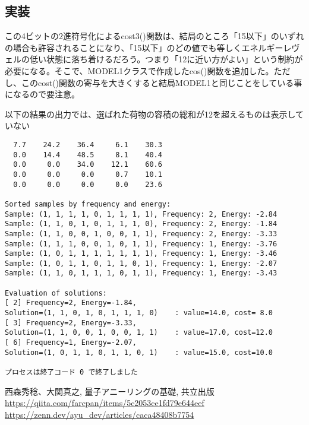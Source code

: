 \documentclass[uplatex,dvipdfmx,a4paper,11pt,oneside,openany]{jsbook}
\begin{document}
\subsection{実装}



この4ビットの2進符号化によるcost3()関数は、結局のところ「15以下」のいずれの場合も許容されることになり、「15以下」のどの値でも等しくエネルギーレヴェルの低い状態に落ち着けるだろう。つまり「12に近い方がよい」という制約が必要になる。そこで、MODEL1クラスで作成したcos()関数を追加した。ただし、このcost()関数の寄与を大きくすると結局MODEL1と同じことをしている事になるので要注意。

以下の結果の出力では、選ばれた荷物の容積の総和が12を超えるものは表示していない

\begin{verbatim}
  7.7    24.2    36.4     6.1    30.3
  0.0    14.4    48.5     8.1    40.4
  0.0     0.0    34.0    12.1    60.6
  0.0     0.0     0.0     0.7    10.1
  0.0     0.0     0.0     0.0    23.6

Sorted samples by frequency and energy:
Sample: (1, 1, 1, 1, 0, 1, 1, 1, 1), Frequency: 2, Energy: -2.84
Sample: (1, 1, 0, 1, 0, 1, 1, 1, 0), Frequency: 2, Energy: -1.84
Sample: (1, 1, 0, 0, 1, 0, 0, 1, 1), Frequency: 2, Energy: -3.33
Sample: (1, 1, 1, 0, 0, 1, 0, 1, 1), Frequency: 1, Energy: -3.76
Sample: (1, 0, 1, 1, 1, 1, 1, 1, 1), Frequency: 1, Energy: -3.46
Sample: (1, 0, 1, 1, 0, 1, 1, 0, 1), Frequency: 1, Energy: -2.07
Sample: (1, 1, 0, 1, 1, 1, 0, 1, 1), Frequency: 1, Energy: -3.43

Evaluation of solutions:
[ 2] Frequency=2, Energy=-1.84,
Solution=(1, 1, 0, 1, 0, 1, 1, 1, 0)	: value=14.0, cost= 8.0
[ 3] Frequency=2, Energy=-3.33,
Solution=(1, 1, 0, 0, 1, 0, 0, 1, 1)	: value=17.0, cost=12.0
[ 6] Frequency=1, Energy=-2.07,
Solution=(1, 0, 1, 1, 0, 1, 1, 0, 1)	: value=15.0, cost=10.0

プロセスは終了コード 0 で終了しました
\end{verbatim}


\begin{thebibliography}{9}
   西森秀稔、大関真之, 量子アニーリングの基礎, 共立出版
   \url{https://qiita.com/farcpan/items/5c2053ce1fd79e644eef}
   \url{https://zenn.dev/ayu_dev/articles/caca48408b7754}
\end{thebibliography}
\end{document}
